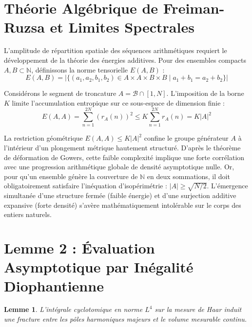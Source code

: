 \documentclass[11pt,a4paper]{article}
\newtheorem{lemma}[theorem]{Lemme}
\begin{document}
\section{Théorie Algébrique de Freiman-Ruzsa et Limites Spectrales}

L'amplitude de répartition spatiale des séquences arithmétiques requiert le développement de la théorie des énergies additives. Pour des ensembles compacts $A, B \subset \mathbb{N}$, définissons la norme tensorielle $E(A, B)$ :
\begin{equation}
E(A, B) = \left| \{ (a_1, a_2, b_1, b_2) \in A \times A \times B \times B \mid a_1 + b_1 = a_2 + b_2 \} \right|
\end{equation}

Considérons le segment de troncature $A = \mathcal{B} \cap [1, N]$. L'imposition de la borne $K$ limite l'accumulation entropique sur ce sous-espace de dimension finie :
\begin{equation}
E(A, A) = \sum_{n=1}^{2N} (r_A(n))^2 \le K \sum_{n=1}^{2N} r_A(n) = K |A|^2
\end{equation}

La restriction géométrique $E(A, A) \le K |A|^2$ confine le groupe générateur $A$ à l'intérieur d'un plongement métrique hautement structuré. D'après le théorème de déformation de Gowers, cette faible complexité implique une forte corrélation avec une progression arithmétique globale de densité asymptotique nulle.
Or, pour qu'un ensemble génère la couverture de $\mathbb{N}$ en deux sommations, il doit obligatoirement satisfaire l'inéquation d'isopérimétrie : $|A| \ge \sqrt{N/2}$. L'émergence simultanée d'une structure fermée (faible énergie) et d'une surjection additive expansive (forte densité) s'avère mathématiquement intolérable sur le corps des entiers naturels.

\section{Lemme 2 : Évaluation Asymptotique par Inégalité Diophantienne}

\begin{lemma}
L'intégrale cyclotomique en norme $L^4$ sur la mesure de Haar induit une fracture entre les pôles harmoniques majeurs et le volume mesurable continu.
\end{lemma}
\end{document}

